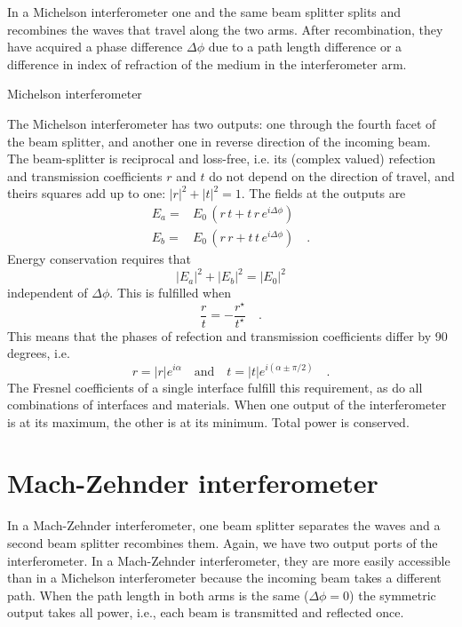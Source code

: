 In a Michelson interferometer one and the same beam splitter splits and recombines the waves that travel along the two arms. After recombination, they have acquired a phase difference $\Delta \phi$ due to a path length difference or a difference in index of refraction of the medium in the interferometer arm.

\begin{marginfigure}
  \caption{Michelson interferometer}
\end{marginfigure}

The Michelson interferometer has two outputs: one through the fourth facet of the beam splitter, and another one in reverse direction of the incoming beam. The beam-splitter is reciprocal and loss-free, i.e. its (complex valued) refection and transmission coefficients $r$ and $t$ do not depend on the direction of travel, and theirs squares add up to one: $|r|^2+ |t|^2 = 1$. The fields at the outputs are
\begin{align}
  E_a = & E_0 \, \left( r \, t  + t \, r \, e^{i \Delta \phi} \right) \\
  E_b = & E_0 \, \left( r \, r  + t \, t  \, e^{i \Delta \phi} \right)   \quad .
\end{align}
Energy conservation requires that 
\begin{equation}
  |E_a|^2 +  |E_b|^2 =  |E_0|^2
\end{equation}
independent of $\Delta \phi$. This is fulfilled when 
\begin{equation}
  \frac{r}{t} = - \frac{r^\star}{t^\star} \quad.
\end{equation}
This means that  the phases of refection and transmission coefficients differ by 90 degrees, i.e.
\begin{equation}
  r = |r| e^{i \alpha} \quad \text{and} \quad  t = |t| e^{i (\alpha \pm \pi/2) } \quad .
\end{equation}
The Fresnel coefficients of a single interface fulfill this requirement, as do all combinations of interfaces and materials. When one output of the interferometer is at its maximum, the other is at its minimum. Total power is conserved.


\section{Mach-Zehnder interferometer}

In a Mach-Zehnder interferometer, one beam splitter separates the waves and a second beam splitter recombines them. Again, we have two output ports of the interferometer. In a Mach-Zehnder interferometer, they are more easily accessible than in a Michelson interferometer because the incoming beam takes a different path. When the path length in both arms is the same ($\Delta \phi = 0$) the symmetric output takes all power, i.e., each beam is transmitted and reflected once.

